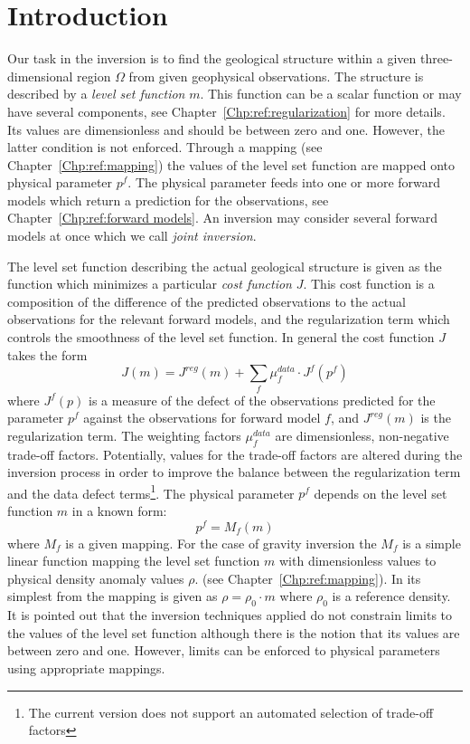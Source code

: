 \chapter{Introduction}\label{Chp:ref:introduction}
Our task in the inversion is to find the geological structure within a given three-dimensional region $\Omega$ from given geophysical 
observations. 
The structure is described by a \emph{level set function} $m$.
This function can be a scalar function or may have several components,
see Chapter~\ref{Chp:ref:regularization} for more details.
Its values are dimensionless and should be between zero and one.
However, the latter condition is not enforced.
Through a mapping (see Chapter~\ref{Chp:ref:mapping}) the values
of the level set function are mapped onto physical parameter $p^f$.
The physical parameter feeds into one or more forward models
which return a prediction for the observations, see Chapter~\ref{Chp:ref:forward models}.
An inversion may consider several forward models at once which we call
\emph{joint inversion}.


The level set function describing the actual geological structure is given as
the function which minimizes a particular \emph{cost function}
$J$.
This cost function is a composition of the difference of the predicted
observations to the actual observations for the relevant forward models, and
the regularization term which controls the smoothness of
the level set function.
In general the cost function $J$ takes the form
\begin{equation}\label{REF:EQU:INTRO 1}
J(m) = J^{reg}(m) + \sum_{f} \mu^{data}_{f} \cdot J^{f}(p^f)
\end{equation} 
where $J^{f}(p)$ is a measure of the defect of the observations predicted for
the parameter $p^f$ against the observations for forward model $f$, and
$J^{reg}(m)$ is the regularization term.
The weighting factors $\mu^{data}_{f}$ are dimensionless, non-negative
trade-off factors.
Potentially, values for the trade-off factors are altered during the inversion
process in order to improve the balance between the regularization term and
the data defect terms\footnote{The current version does not support an automated selection 
of trade-off factors}.
The physical parameter $p^f$ depends on the level set function
$m$ in a known form:
\begin{equation}\label{REF:EQU:INTRO 1b}
p^f = M_{f}(m)
\end{equation} 
where $M_f$ is a given mapping. For the case of gravity inversion
the $M_f$ is a simple linear function mapping the level set function $m$ with dimensionless values 
to physical density anomaly values $\rho$.
(see Chapter~\ref{Chp:ref:mapping}). In its simplest from the mapping is given as 
$\rho = \rho_0 \cdot m$ where $\rho_0$ is a reference density. It is pointed out that 
the inversion techniques applied do not constrain limits to the values of the level set function
although there is the notion that its values are between zero and one. However, 
limits can be enforced to physical parameters using appropriate mappings.

